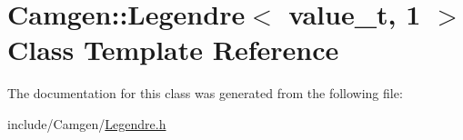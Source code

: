 \hypertarget{a00325}{}\section{Camgen\+:\+:Legendre$<$ value\+\_\+t, 1 $>$ Class Template Reference}
\label{a00325}


The documentation for this class was generated from the following file\+:\begin{DoxyCompactItemize}
\item 
include/\+Camgen/\hyperlink{a00677}{Legendre.\+h}\end{DoxyCompactItemize}
